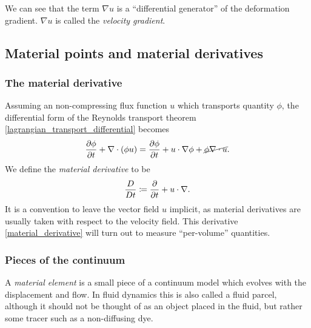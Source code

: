 We can see that the term $\nabla u$ is a ``differential generator'' of the deformation gradient.
$\nabla u$ is called the \textit{velocity gradient}.

\subsection{Material points and material derivatives}\label{material_points}
\subsubsection{The material derivative}

Assuming an non-compressing flux function $u$ which transports quantity $\phi$, the differential form of the Reynolds transport theorem
\eqref{lagrangian_transport_differential} becomes
\begin{equation}
    \frac{\partial \phi}{\partial t} + \nabla\cdot(\phi u) = \frac{\partial \phi}{\partial t} + u\cdot\nabla\phi + \cancel{\phi \nabla\cdot u}.
\end{equation}
We define the \textit{material derivative} to be
\begin{equation}\label{material_derivative}
    \frac{D}{Dt} \coloneqq \frac{\partial }{\partial t} + u\cdot\nabla.
\end{equation}
It is a convention to leave the vector field $u$ implicit, as material derivatives are usually taken with respect to the velocity field.
This derivative \eqref{material_derivative} will turn out to measure ``per-volume'' quantities.

\subsubsection{Pieces of the continuum}
A \textit{material element} is a small piece of a continuum model which evolves with the displacement and flow.
In fluid dynamics this is also called a fluid parcel, although it should not be thought of as an object placed in the fluid, but
rather some tracer such as a non-diffusing dye.

